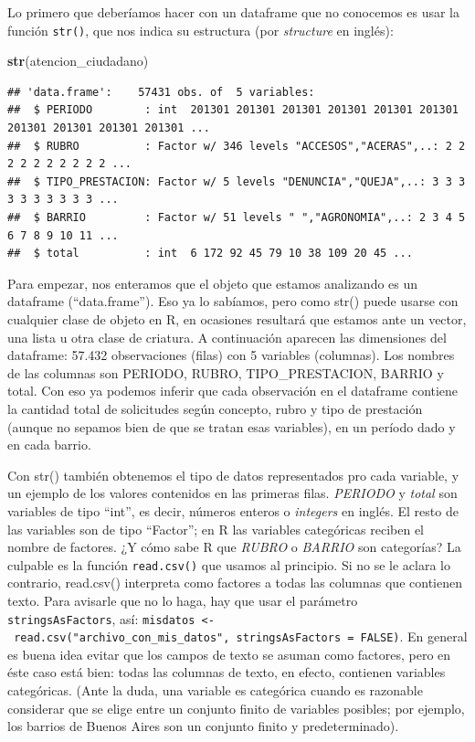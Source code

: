\documentclass[]{book}
\newenvironment{Shaded}{\begin{snugshade}}{\end{snugshade}}
\newcommand{\KeywordTok}[1]{\textcolor[rgb]{0.13,0.29,0.53}{\textbf{#1}}}
\newcommand{\NormalTok}[1]{#1}
\begin{document}
Lo primero que deberíamos hacer con un dataframe que no conocemos es
usar la función \texttt{str()}, que nos indica su estructura (por
\emph{structure} en inglés):

\begin{Shaded}
\begin{Highlighting}[]
\KeywordTok{str}\NormalTok{(atencion_ciudadano)}
\end{Highlighting}
\end{Shaded}

\begin{verbatim}
## 'data.frame':    57431 obs. of  5 variables:
##  $ PERIODO        : int  201301 201301 201301 201301 201301 201301 201301 201301 201301 201301 ...
##  $ RUBRO          : Factor w/ 346 levels "ACCESOS","ACERAS",..: 2 2 2 2 2 2 2 2 2 2 ...
##  $ TIPO_PRESTACION: Factor w/ 5 levels "DENUNCIA","QUEJA",..: 3 3 3 3 3 3 3 3 3 3 ...
##  $ BARRIO         : Factor w/ 51 levels " ","AGRONOMIA",..: 2 3 4 5 6 7 8 9 10 11 ...
##  $ total          : int  6 172 92 45 79 10 38 109 20 45 ...
\end{verbatim}

Para empezar, nos enteramos que el objeto que estamos analizando es un
dataframe (``data.frame''). Eso ya lo sabíamos, pero como str() puede
usarse con cualquier clase de objeto en R, en ocasiones resultará que
estamos ante un vector, una lista u otra clase de criatura. A
continuación aparecen las dimensiones del dataframe: 57.432
observaciones (filas) con 5 variables (columnas). Los nombres de las
columnas son PERIODO, RUBRO, TIPO\_PRESTACION, BARRIO y total. Con eso
ya podemos inferir que cada observación en el dataframe contiene la
cantidad total de solicitudes según concepto, rubro y tipo de prestación
(aunque no sepamos bien de que se tratan esas variables), en un período
dado y en cada barrio.

Con str() también obtenemos el tipo de datos representados pro cada
variable, y un ejemplo de los valores contenidos en las primeras filas.
\emph{PERIODO} y \emph{total} son variables de tipo ``int'', es decir,
números enteros o \emph{integers} en inglés. El resto de las variables
son de tipo ``Factor''; en R las variables categóricas reciben el nombre
de factores. ¿Y cómo sabe R que \emph{RUBRO} o \emph{BARRIO} son
categorías? La culpable es la función \texttt{read.csv()} que usamos al
principio. Si no se le aclara lo contrario, read.csv() interpreta como
factores a todas las columnas que contienen texto. Para avisarle que no
lo haga, hay que usar el parámetro \texttt{stringsAsFactors}, así:
\texttt{misdatos\ \textless{}-\ read.csv("archivo\_con\_mis\_datos",\ stringsAsFactors\ =\ FALSE)}.
En general es buena idea evitar que los campos de texto se asuman como
factores, pero en éste caso está bien: todas las columnas de texto, en
efecto, contienen variables categóricas. (Ante la duda, una variable es
categórica cuando es razonable considerar que se elige entre un conjunto
finito de variables posibles; por ejemplo, los barrios de Buenos Aires
son un conjunto finito y predeterminado).
\end{document}
